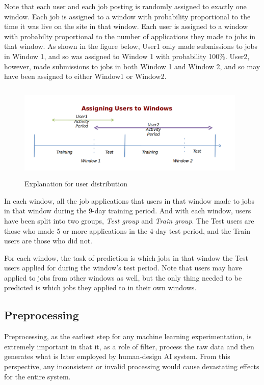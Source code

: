 \documentclass{article} %
\begin{document}
Note that each user and each job posting is randomly assigned to exactly one window.
Each job is assigned to a window with probability proportional to the time it
was live on the site in that window. Each user is assigned to a window with
probabilty proportional to the number of applications they made to jobs in
that window. As shown in the figure below, User1 only made submissions to jobs in
Window 1, and so was assigned to Window 1 with probability 100\%. User2,
however, made submissions to jobs in both Window 1 and Window 2, and so may
have been assigned to either Window1 or Window2.

\begin{figure}[h]
    \begin{center}
        \includegraphics[width=4.3in,height=1.8in]{./fig/assignusertowindows.png}
        \caption{Explanation for user distribution}
    \end{center}
\end{figure}

In each window, all the job applications that users in that window made to
jobs in that window during the 9-day training period. 
And with each window, users have been split into two groups, {\it Test group}
and {\it Train group}. The Test users are those who made 5 or more
applications in the 4-day test period, and the Train users are those who did
not.

For each window, the task of prediction is which jobs in that window the Test
users applied for during the window's test period. Note that users may have
applied to jobs from other windows as well, but the only thing needed to be
predicted is which jobs they applied to in their own windows.


\subsection{Preprocessing} %
Preprocessing, as the earliest step for any machine learning
experimentation, is extremely important in that it, as a role of filter, 
process the raw data and then generates what is later employed by human-design
AI system. From this perspective, any inconsistent or invalid processing would
cause devastating effects for the entire system.
\end{document}
